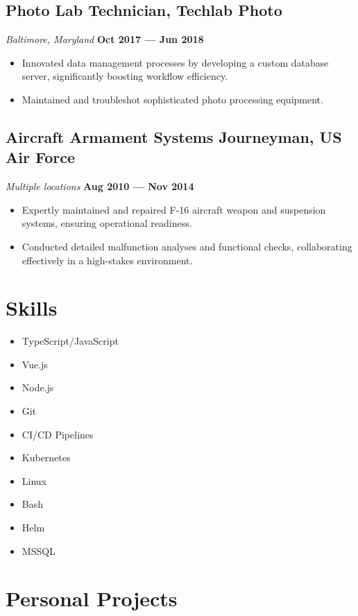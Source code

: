 \documentclass[a4paper,10pt]{article}
\begin{document}
\subsection*{Photo Lab Technician, Techlab Photo}
\textit{Baltimore, Maryland} \hfill \textbf{Oct 2017 — Jun 2018}
\begin{itemize}[leftmargin=1.5em]
    \item Innovated data management processes by developing a custom database server, significantly boosting workflow efficiency.
    \item Maintained and troubleshot sophisticated photo processing equipment.
\end{itemize}

\subsection*{Aircraft Armament Systems Journeyman, US Air Force}
\textit{Multiple locations} \hfill \textbf{Aug 2010 — Nov 2014}
\begin{itemize}[leftmargin=1.5em]
    \item Expertly maintained and repaired F-16 aircraft weapon and suspension systems, ensuring operational readiness.
    \item Conducted detailed malfunction analyses and functional checks, collaborating effectively in a high-stakes environment.
\end{itemize}

\section*{Skills}
\begin{itemize}[leftmargin=1.5em]
    \item TypeScript/JavaScript
    \item Vue.js
    \item Node.js
    \item Git
    \item CI/CD Pipelines
    \item Kubernetes
    \item Linux
    \item Bash
    \item Helm
    \item MSSQL
\end{itemize}

\section*{Personal Projects}
\end{document}
